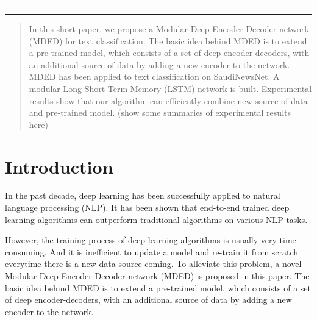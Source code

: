 \documentclass[12pt]{article}
\makeatletter
\def\maketitle{
    \begin{centering}
    \par\rule{\textwidth}{2pt}
    \par\hfill
    \par\textbf{\LARGE\@title}
    \par\hfill
    \par{\textit{\@author}}
    \par\hfill
    \par{\@date}
    \par\rule{\textwidth}{2pt}
    \end{centering}
}
\makeatother
\begin{document}
\thispagestyle{empty}
\maketitle
\hfill
\begin{abstract}

In this short paper, we propose a Modular Deep Encoder-Decoder network (MDED) for text classification. The basic idea behind MDED is to extend a pre-trained model, which consists of a set of deep encoder-decoders, with an additional source of data by adding a new encoder to the network. MDED has been applied to text classification on SaudiNewsNet. A modular Long Short Term Memory (LSTM) network is built. Experimental results show that our algorithm can efficiently combine new source of data and pre-trained model. (show some summaries of experimental results here)

\end{abstract}

\section{Introduction}\label{introduction}


In the past decade, deep learning has been successfully applied to natural language processing (NLP). It has been shown that end-to-end trained deep learning algorithms can outperform traditional algorithms on various NLP tasks.


However, the training process of deep learning algorithms is usually very time-consuming. And it is inefficient to update a model and re-train it from scratch everytime there is a new data source coming. To alleviate this problem, a novel Modular Deep Encoder-Decoder network (MDED) is proposed in this paper. The basic idea behind MDED is to extend a pre-trained model, which consists of a set of deep encoder-decoders, with an additional source of data by adding a new encoder to the network. 
\end{document}
